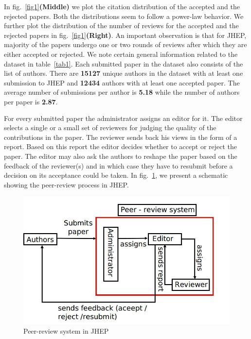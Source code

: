 In fig.~\ref{fig1}{\bf(Middle)} we plot the citation distribution of the accepted and the rejected papers. Both the distributions seem to follow a power-law behavior. We further plot 
the distribution of the number of reviews for the accepted and the rejected papers in fig.~\ref{fig1}{\bf(Right)}. An important observation is that for JHEP, majority of the 
papers undergo one or two rounds of reviews after which they are either accepted or rejected. 
We note certain general information related to the dataset in table~\ref{tab1}.
Each submitted paper in the dataset also consists of the list of authors. There are {\bf 15127} unique authors in the dataset with at least one submission to JHEP and {\bf 12434} authors with at least one accepted paper. The average number of submissions per author is {\bf 5.18} while the number of authors per paper is {\bf 2.87}. 

 For every submitted paper the administrator assigns an editor for it. The editor selects a single or a small set of reviewers for judging the quality of the contributions in the paper. The reviewer sends back his views in the form of a report. Based on this report the editor decides whether to accept or reject the paper. The editor may also ask the authors to reshape the paper based on the feedback of the reviewer(s) and in which case they have to resubmit before a decision on its acceptance could be taken. In fig.~\ref{peer_review}, we present a schematic showing the peer-review process in JHEP.

\begin{figure}
\centering
\includegraphics[scale=0.3]{./texfiles/Chapter_4/jcdl/figures/peer_review.jpg}
\caption{\label{peer_review} Peer-review system in JHEP}
\end{figure}
%

